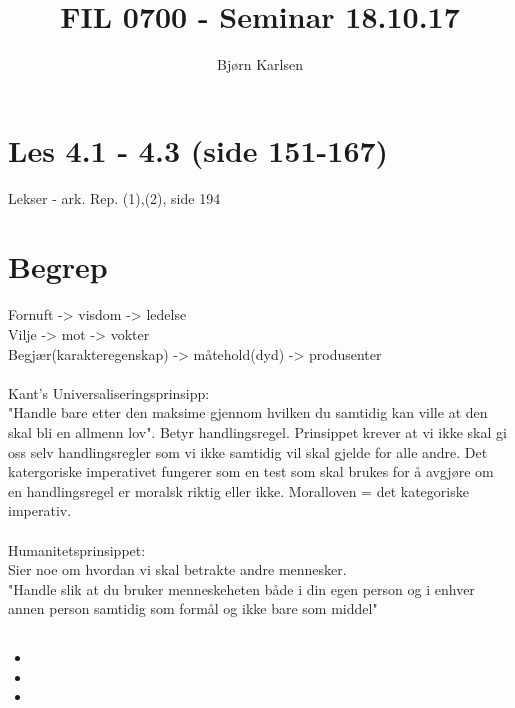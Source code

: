 \documentclass[11pt]{article}
\title{\textbf{FIL 0700 - Seminar 18.10.17}}
\author{Bjørn Karlsen}
\date{}
\begin{document}
\maketitle

\section{Les 4.1 - 4.3 (side 151-167)}
Lekser - ark. Rep. (1),(2), side 194

\section{Begrep}
Fornuft -> visdom -> ledelse\\
Vilje -> mot -> vokter\\
Begjær(karakteregenskap) -> måtehold(dyd) -> produsenter\\\\
Kant's Universaliseringsprinsipp:\\
"Handle bare etter den maksime gjennom hvilken du samtidig kan ville at den skal bli en allmenn lov". Betyr handlingsregel. Prinsippet krever at vi ikke skal gi oss selv handlingsregler som vi ikke samtidig vil skal gjelde for alle andre. Det katergoriske imperativet fungerer som en test som skal brukes for å avgjøre om en handlingsregel er moralsk riktig eller ikke. Moralloven = det kategoriske imperativ.\\\\
Humanitetsprinsippet:\\
Sier noe om hvordan vi skal betrakte andre mennesker.\\ "Handle slik at du bruker menneskeheten både i din egen person og i enhver annen person samtidig som formål og ikke bare som middel"
\subsection{}
\begin{itemize}
\item{}
\item{}
\item{}
\end{itemize}

\subsection{}

\subsection{}

\subsection{}
\section{}

\section{}

\section{}
\end{document}
